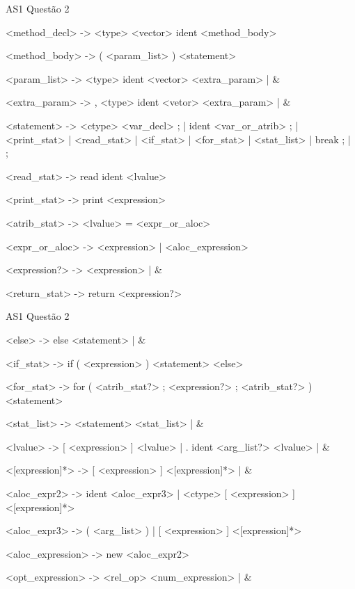 \documentclass[10pt]{beamer}
\begin{document}
\begin{frame}{AS1 Questão 2}

<method\_decl> -> <type> <vector> ident <method\_body>

<method\_body> -> ( <param\_list> ) <statement>

<param\_list> -> <type> ident <vector> <extra\_param> | \&

<extra\_param> -> , <type> ident <vetor> <extra\_param> | \&

<statement> -> <ctype> <var\_decl> ; | ident <var\_or\_atrib> ; | <print\_stat> | <read\_stat> | <if\_stat> | <for\_stat> | { <stat\_list> } | break ; | ;

<read\_stat> -> read ident <lvalue>

<print\_stat> -> print <expression>

<atrib\_stat> -> <lvalue> = <expr\_or\_aloc>

<expr\_or\_aloc> -> <expression> | <aloc\_expression>

<expression?> -> <expression> | \&

<return\_stat> -> return <expression?>

\end{frame}
\begin{frame}{AS1 Questão 2}

<else> -> else <statement> | \&

<if\_stat> -> if ( <expression> ) <statement> <else>

<for\_stat> -> for ( <atrib\_stat?> ; <expression?> ; <atrib\_stat?> ) <statement>

<stat\_list> -> <statement> <stat\_list> | \&

<lvalue> -> [ <expression> ] <lvalue> | . ident <arg\_list?> <lvalue> | \&

<[expression]*> -> [ <expression> ] <[expression]*> | \&

<aloc\_expr2> -> ident <aloc\_expr3> | <ctype> [ <expression> ] <[expression]*>

<aloc\_expr3> -> ( <arg\_list> ) | [ <expression> ] <[expression]*>

<aloc\_expression> -> new <aloc\_expr2>

<opt\_expression> -> <rel\_op> <num\_expression> | \&

\end{frame}
\end{document}
